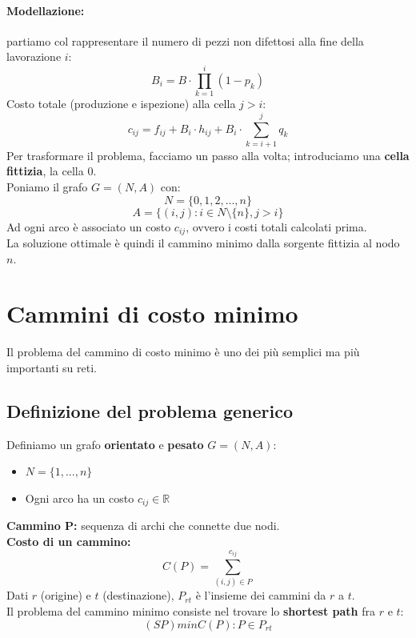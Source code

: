 \documentclass[12pt,a4paper]{article}
\let\oldsection\section
\renewcommand{\section}{\clearpage\oldsection}
\begin{document}
\paragraph{Modellazione:} partiamo col rappresentare il numero di pezzi non difettosi alla fine della lavorazione $i$:
\[
B_i = B \cdot \prod_{k=1}^{i} (1 - p_k)
\]
Costo totale (produzione e ispezione) alla cella $j > i$:
\[
c_{ij} = f_{ij} + B_i \cdot h_{ij} + B_i \cdot \sum_{k = i+1}^{j} q_k
\]
Per trasformare il problema, facciamo un passo alla volta; introduciamo una \textbf{cella fittizia}, la cella $0$.\\
Poniamo il grafo $G = (N,A)$ con:
\[
N = \{0,1,2,...,n\}
\]
\[
A = \{(i,j): i \in N \setminus \{n\}, j > i\}
\]
Ad ogni arco è associato un costo $c_{ij}$, ovvero i costi totali calcolati prima.\\
La soluzione ottimale è quindi il cammino minimo dalla sorgente fittizia al nodo $n$.

\section{Cammini di costo minimo}
Il problema del cammino di costo minimo è uno dei più semplici ma più importanti su reti.\\
\subsection{Definizione del problema generico}
Definiamo un grafo \textbf{orientato} e \textbf{pesato} $G = (N,A)$:
\begin{itemize}
    \item $N = \{1,...,n\}$
    \item Ogni arco ha un costo $c_{ij} \in \mathbb{R}$
\end{itemize}
\textbf{Cammino P:} sequenza di archi che connette due nodi.\\
\textbf{Costo di un cammino:}
\[
C(P) = \sum_{(i,j) \in P}^{c_{ij}}
\] 
Dati $r$ (origine) e $t$ (destinazione), $P_{rt}$ è l'insieme dei cammini da $r$ a $t$.\\
Il problema del cammino minimo consiste nel trovare lo \textbf{shortest path} fra $r$ e $t$:
\[
(SP) min{C(P): P \in P_{rt}}
\]
\end{document}
